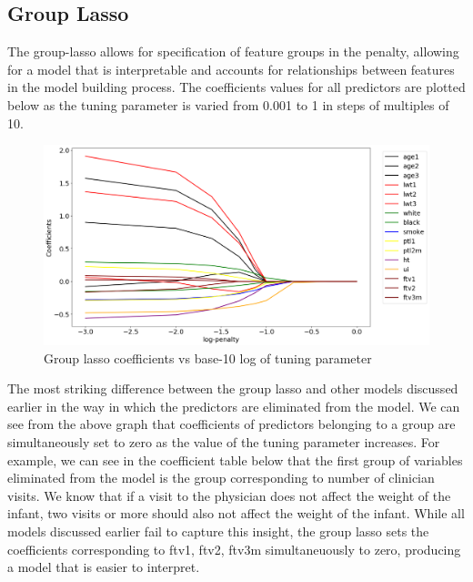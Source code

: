 \documentclass[a4paper,12pt]{article}
\begin{document}
\subsection{Group Lasso}
The group-lasso allows for specification of feature groups in the penalty, allowing for a model that is interpretable and accounts for relationships between features in the model building process. The coefficients values for all predictors are plotted below as the tuning parameter is varied from 0.001 to 1 in steps of multiples of 10. 
\\
\begin{figure}[H]
 \centering
 \includegraphics[scale=0.4]{grplasso-path.png}
  \caption{Group lasso coefficients vs base-10 log of tuning parameter}
  \label{fig:neurons}
\end{figure}
\noindent 
The most striking difference between the group lasso and other models discussed earlier in the way in which the predictors are eliminated from the model. We can see from the above graph that coefficients of predictors belonging to a group are simultaneously set to zero as the value of the tuning parameter increases. For example, we can see in the coefficient table below that the first group of variables eliminated from the model is the group corresponding to number of clinician visits. We know that if a visit to the physician does not affect the weight of the infant, two visits or more should also not affect the weight of the infant. While all models discussed earlier fail to capture this insight, the group lasso sets the coefficients corresponding to ftv1, ftv2, ftv3m simultaneuously to zero, producing a model that is easier to interpret.
\end{document}
